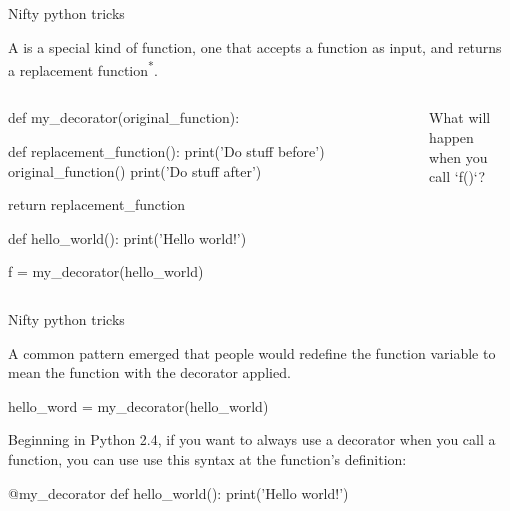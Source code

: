 \documentclass[aspectratio=149] {beamer}
\begin{document}
\begin{frame}[fragile]{Nifty python tricks}

  A  is a special kind of function, 
  one that accepts a function as input, 
  and returns a replacement function\textsuperscript{*}.


  \medskip \pause

  \begin{columns}

    \begin{column}[b]{.65\textwidth}

      \begin{smallpythoncode}
      def my_decorator(original_function):
    
          def replacement_function():
              print('Do stuff before')
              original_function()
              print('Do stuff after')

          return replacement_function

      def hello_world():
          print('Hello world!')

      f = my_decorator(hello_world)

      \end{smallpythoncode}
      
    \end{column}
    \begin{column}[b]{.3\textwidth}

      What will happen\\when you call \inline`f()`?

      \vspace{1cm}

    \end{column}
  \end{columns}
\end{frame}


\begin{frame}[fragile]{Nifty python tricks}

  A common pattern emerged that people would redefine the function variable to mean the function with the decorator applied.
  \begin{pythoncode}
    hello_word = my_decorator(hello_world)
  \end{pythoncode}
  
  \pause \medskip
  
  Beginning in Python 2.4, if you want to {always} use a decorator when you call a function, you can use use this syntax 
  at the function's definition:
  \begin{pythoncode}
    @my_decorator
    def hello_world():
        print('Hello world!')
  \end{pythoncode}

\end{frame}
\end{document}
